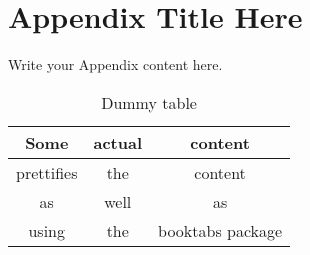 
\chapter{Appendix Title Here} %

\label{AppendixA} %


Write your Appendix content here.

	\begin{table}[h!]
		\begin{center}
			\caption{Dummy table}
			\label{tbl:table2}
			\begin{tabular}{ccc}
				\toprule
				Some & actual & content\\
				\midrule
				prettifies & the & content\\
				\hline
				as & well & as\\
				\hline
				using & the & booktabs package\\
				\bottomrule
			\end{tabular}
		\end{center}
	\end{table}